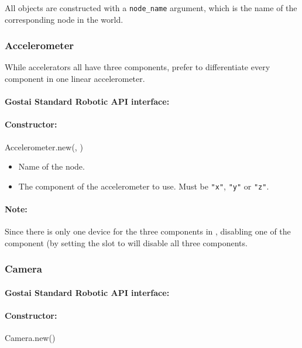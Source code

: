 All objects are constructed with a \verb+node_name+ argument, which is
the name of the corresponding node in the \webots world.

\subsubsection{Accelerometer}

While \webots accelerators all have three components, \urbi prefer to
differentiate every component in one linear accelerometer.

\paragraph{Gostai Standard Robotic API interface:} 

\paragraph{Constructor:} Accelerometer.new(, )

\begin{itemize}
\item {} Name of the \webots node.
\item {} The component of the \webots accelerometer
  to use. Must be \verb+"x"+, \verb+"y"+ or \verb+"z"+.
\end{itemize}

\paragraph{Note:} Since there is only one device for the three
components in \webots, disabling one of the component (by setting the
 slot to  will disable all three components.

\subsubsection{Camera}

\paragraph{Gostai Standard Robotic API interface:} 

\paragraph{Constructor: } Camera.new()

